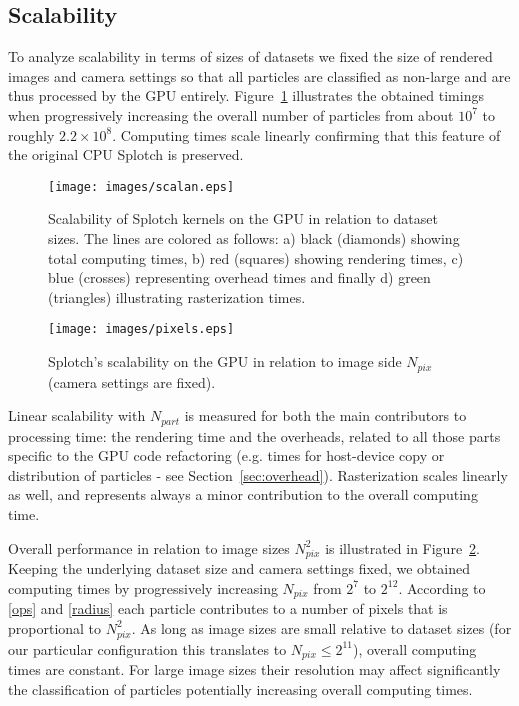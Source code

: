 \documentclass[1p]{elsarticle}
\begin{document}
\subsection{Scalability}
\label{sec:scalability}
To analyze scalability in terms of sizes of datasets we fixed the size of rendered images and camera settings so that all particles are classified as non-large and are thus processed by the GPU entirely. 
Figure~\ref{fig:scalability} illustrates the obtained timings when progressively increasing the overall number of particles
from about $10^7$ to roughly $2.2\times10^8$. Computing times scale linearly confirming that this feature of the original CPU Splotch is preserved. 
\begin{figure}
\centering
\texttt{[image: images/scalan.eps]}
\caption{Scalability of Splotch kernels on the GPU in relation to dataset sizes. 
The lines are colored as follows: a) black (diamonds) showing total computing times, b) red (squares) showing rendering times, c) blue (crosses) representing overhead times and finally d) green (triangles) illustrating rasterization times.}
\label{fig:scalability}
\end{figure}

\begin{figure}
\centering
\texttt{[image: images/pixels.eps]}
\caption{Splotch's scalability on the GPU in relation to image side $N_{pix}$ (camera settings are fixed).}
\label{fig:pixels}
\end{figure}

Linear scalability with $N_{part}$ is measured for both the main contributors to processing time: the rendering time and the overheads, related to all those parts specific to the GPU code refactoring (e.g. times for host-device copy or distribution of particles - see Section~\ref{sec:overhead}).
Rasterization scales linearly as well, and represents always a minor contribution to the overall computing time.  

Overall performance in relation to image sizes $N_{pix}^2$ is illustrated in Figure~\ref{fig:pixels}. Keeping the underlying dataset size and camera settings fixed, we obtained computing times by progressively increasing
$N_{pix}$ from ${2}^{7}$ to ${2}^{12}$. According to \eqref{ops} and \eqref{radius} each particle contributes to a number of pixels that is proportional to $N_{pix}^{2}$. As long as image sizes are small relative to dataset sizes (for our particular configuration this translates to $N_{pix} \le 2^{11}$), overall computing times are constant. For large image sizes their resolution may affect significantly the classification of particles potentially increasing overall computing times.
 
\end{document}
